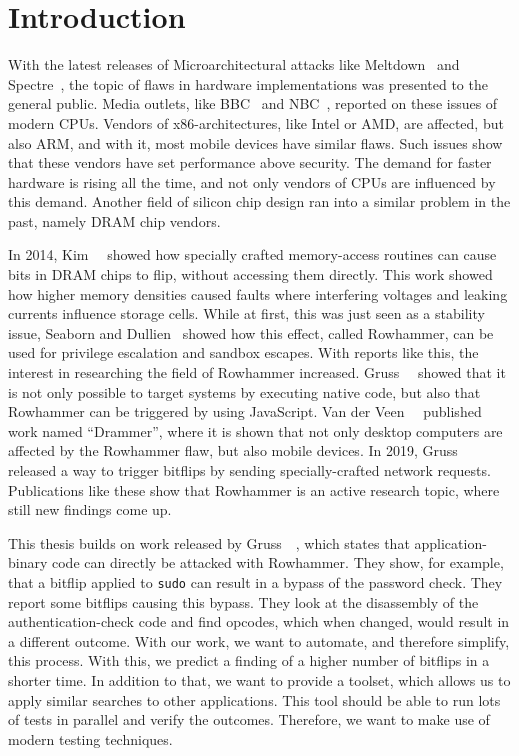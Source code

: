 \chapter{Introduction}\label{sec:intro}

With the latest releases of Microarchitectural attacks like
Meltdown~\cite{meltdown} and Spectre~\cite{spectre}, the topic of flaws in
hardware implementations was presented to the general public. Media outlets,
like BBC~\cite{bbcmeltdown} and NBC~\cite{nbcmeltdown}, reported on these issues
of modern CPUs. Vendors of x86-architectures, like Intel or AMD, are affected,
but also ARM, and with it, most mobile devices have similar flaws. Such issues
show that these vendors have set performance above security. The demand for
faster hardware is rising all the time, and not only vendors of CPUs are
influenced by this demand. Another field of silicon chip design ran into a
similar problem in the past, namely DRAM chip vendors.

In 2014, Kim~\etal~\cite{rowhammergeneral} showed how specially crafted
memory-access routines can cause bits in DRAM chips to flip, without accessing
them directly. This work showed how higher memory densities caused faults where
interfering voltages and leaking currents influence storage cells. While at
first, this was just seen as a stability issue, Seaborn and
Dullien~\cite{projectzerorow} showed how this effect, called Rowhammer, can be
used for privilege escalation and sandbox escapes. With reports like this, the
interest in researching the field of Rowhammer increased.
Gruss~\etal~\cite{rowhammerjs} showed that it is not only possible to target
systems by executing native code, but also that Rowhammer can be triggered by
using JavaScript. Van der Veen~\etal~\cite{drammer} published work named
``Drammer'', where it is shown that not only desktop computers are affected by
the Rowhammer flaw, but also mobile devices. In 2019,
Gruss~\etal~\cite{nethammer} released a way to trigger bitflips by sending
specially-crafted network requests. Publications like these show that Rowhammer
is an active research topic, where still new findings come up.

This thesis builds on work released by Gruss~\etal~\cite{flipinthewall}, which
states that application-binary code can directly be attacked with Rowhammer.
They show, for example, that a bitflip applied to \texttt{sudo} can result in a
bypass of the password check. They report some bitflips causing this bypass.
They look at the disassembly of the authentication-check code and find opcodes,
which when changed, would result in a different outcome. With our work, we want
to automate, and therefore simplify, this process. With this, we predict a
finding of a higher number of bitflips in a shorter time. In addition to that,
we want to provide a toolset, which allows us to apply similar searches to other
applications. This tool should be able to run lots of tests in parallel and
verify the outcomes. Therefore, we want to make use of modern testing
techniques.

